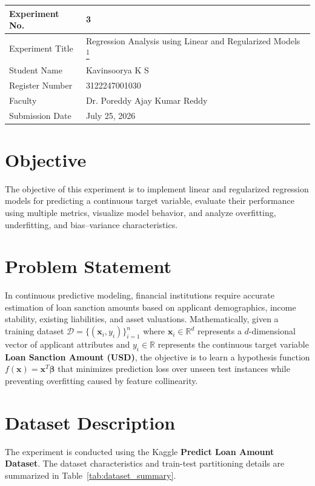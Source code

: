 \documentclass[12pt,a4paper]{article}
\begin{document}
\begin{tabular}{|p{4cm}|p{11cm}|}
\hline
Experiment No. & 3 \\ \hline
Experiment Title & Regression Analysis using Linear and Regularized Models \href{https://github.com/Kavin-ks/Machine-Learning-Projects}{\textsuperscript{1}}\\ \hline
Student Name & Kavinsoorya K S \\ \hline
Register Number & 3122247001030 \\ \hline
Faculty & Dr. Poreddy Ajay Kumar Reddy \\ \hline
Submission Date & July 25, 2026 \\ \hline
\end{tabular}

\vspace{0.5cm}

\section{Objective}
The objective of this experiment is to implement linear and regularized regression models for predicting a continuous target variable, evaluate their performance using multiple metrics, visualize model behavior, and analyze overfitting, underfitting, and bias--variance characteristics.

\section{Problem Statement}
In continuous predictive modeling, financial institutions require accurate estimation of loan sanction amounts based on applicant demographics, income stability, existing liabilities, and asset valuations. Mathematically, given a training dataset $\mathcal{D} = \{(\mathbf{x}_i, y_i)\}_{i=1}^n$ where $\mathbf{x}_i \in \mathbb{R}^d$ represents a $d$-dimensional vector of applicant attributes and $y_i \in \mathbb{R}$ represents the continuous target variable \textbf{Loan Sanction Amount (USD)}, the objective is to learn a hypothesis function $f(\mathbf{x}) = \mathbf{x}^T \boldsymbol{\beta}$ that minimizes prediction loss over unseen test instances while preventing overfitting caused by feature collinearity.

\section{Dataset Description}
The experiment is conducted using the Kaggle \textbf{Predict Loan Amount Dataset}. The dataset characteristics and train-test partitioning details are summarized in Table~\ref{tab:dataset_summary}.
\end{document}
